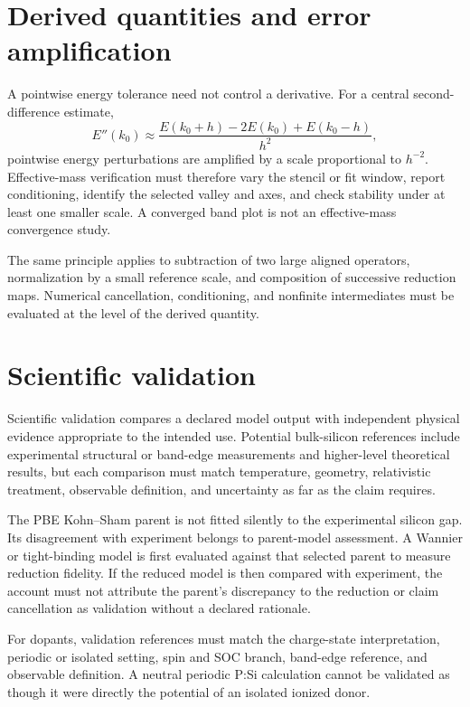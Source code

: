 \section{Derived quantities and error amplification}

A pointwise energy tolerance need not control a derivative. For a central
second-difference estimate,
\begin{equation}
  E''(k_0)
  \approx
  \frac{E(k_0+h)-2E(k_0)+E(k_0-h)}{h^2},
\end{equation}
pointwise energy perturbations are amplified by a scale proportional to
$h^{-2}$. Effective-mass verification must therefore vary the stencil or fit
window, report conditioning, identify the selected valley and axes, and check
stability under at least one smaller scale. A converged band plot is not an
effective-mass convergence study.

The same principle applies to subtraction of two large aligned operators,
normalization by a small reference scale, and composition of successive
reduction maps. Numerical cancellation, conditioning, and nonfinite
intermediates must be evaluated at the level of the derived quantity.

\section{Scientific validation}

Scientific validation compares a declared model output with independent
physical evidence appropriate to the intended use. Potential bulk-silicon
references include experimental structural or band-edge measurements and
higher-level theoretical results, but each comparison must match temperature,
geometry, relativistic treatment, observable definition, and uncertainty as far
as the claim requires.

The PBE Kohn--Sham parent is not fitted silently to the experimental silicon gap.
Its disagreement with experiment belongs to parent-model assessment. A
Wannier or tight-binding model is first evaluated against that selected parent
to measure reduction fidelity. If the reduced model is then compared with
experiment, the account must not attribute the parent's discrepancy to the
reduction or claim cancellation as validation without a declared rationale.

For dopants, validation references must match the charge-state interpretation,
periodic or isolated setting, spin and SOC branch, band-edge reference, and
observable definition. A neutral periodic P:Si calculation cannot be validated
as though it were directly the potential of an isolated ionized donor.

